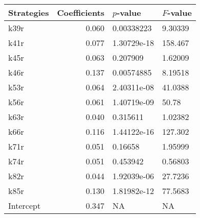 \begin{tabular}{lrll}
\toprule
Strategies &  Coefficients &    $p$-value & $F$-value \\
\midrule
      k39r &         0.060 &   0.00338223 &   9.30339 \\
      k41r &         0.077 &  1.30729e-18 &   158.467 \\
      k45r &         0.063 &     0.207909 &   1.62009 \\
      k46r &         0.137 &   0.00574885 &   8.19518 \\
      k53r &         0.064 &  2.40311e-08 &   41.0388 \\
      k56r &         0.061 &  1.40719e-09 &     50.78 \\
      k63r &         0.040 &     0.315611 &   1.02382 \\
      k66r &         0.116 &  1.44122e-16 &   127.302 \\
      k71r &         0.051 &      0.16658 &   1.95999 \\
      k74r &         0.051 &     0.453942 &   0.56803 \\
      k82r &         0.044 &  1.92039e-06 &   27.7236 \\
      k85r &         0.130 &  1.81982e-12 &   77.5683 \\
 Intercept &         0.347 &           NA &        NA \\
\bottomrule
\end{tabular}
